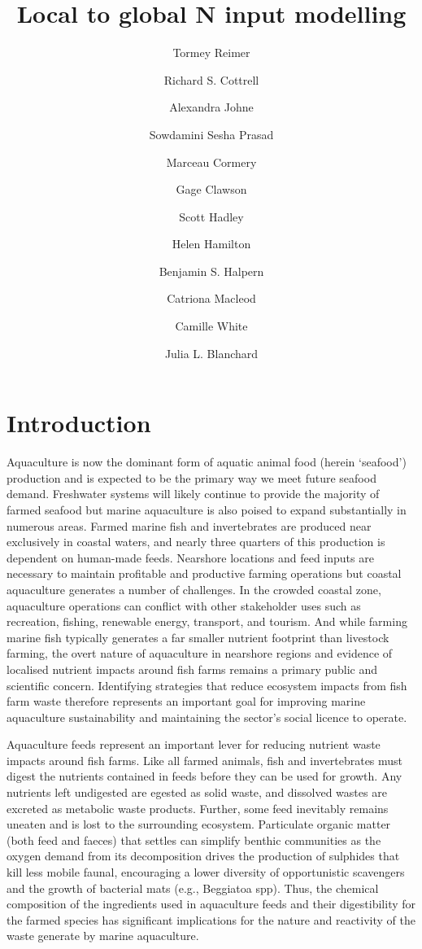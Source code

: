\documentclass[
  a4paper,
]{article}
\title{Local to global N input modelling}
\author[12]{Tormey Reimer}
\author{Richard S. Cottrell}
\author[3]{Alexandra Johne}
\author{Sowdamini Sesha Prasad}
\author{Marceau Cormery}
\author{Gage Clawson}
\author{Scott Hadley}
\author{Helen Hamilton}
\author{Benjamin S. Halpern}
\author{Catriona Macleod}
\author{Camille White}
\author{Julia L. Blanchard}
\affil[1]{Institute for Marine and Antarctic Studies}
\affil[2]{Centre for Marine Socioecology}
\affil[1]{Institute for Marine and Antarctic Studies}
\date{}
\begin{document}
\maketitle


\section{Introduction}\label{introduction}

Aquaculture is now the dominant form of aquatic animal food (herein
`seafood') production and is expected to be the primary way we meet
future seafood demand. Freshwater systems will likely continue to
provide the majority of farmed seafood but marine aquaculture is also
poised to expand substantially in numerous areas. Farmed marine fish and
invertebrates are produced near exclusively in coastal waters, and
nearly three quarters of this production is dependent on human-made
feeds. Nearshore locations and feed inputs are necessary to maintain
profitable and productive farming operations but coastal aquaculture
generates a number of challenges. In the crowded coastal zone,
aquaculture operations can conflict with other stakeholder uses such as
recreation, fishing, renewable energy, transport, and tourism. And while
farming marine fish typically generates a far smaller nutrient footprint
than livestock farming, the overt nature of aquaculture in nearshore
regions and evidence of localised nutrient impacts around fish farms
remains a primary public and scientific concern. Identifying strategies
that reduce ecosystem impacts from fish farm waste therefore represents
an important goal for improving marine aquaculture sustainability and
maintaining the sector's social licence to operate.

Aquaculture feeds represent an important lever for reducing nutrient
waste impacts around fish farms. Like all farmed animals, fish and
invertebrates must digest the nutrients contained in feeds before they
can be used for growth. Any nutrients left undigested are egested as
solid waste, and dissolved wastes are excreted as metabolic waste
products. Further, some feed inevitably remains uneaten and is lost to
the surrounding ecosystem. Particulate organic matter (both feed and
faeces) that settles can simplify benthic communities as the oxygen
demand from its decomposition drives the production of sulphides that
kill less mobile faunal, encouraging a lower diversity of opportunistic
scavengers and the growth of bacterial mats (e.g., Beggiatoa spp). Thus,
the chemical composition of the ingredients used in aquaculture feeds
and their digestibility for the farmed species has significant
implications for the nature and reactivity of the waste generate by
marine aquaculture.
\end{document}

